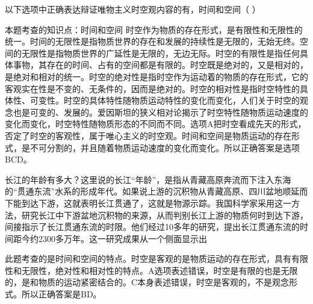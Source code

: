 \question 以下选项中正确表达辩证唯物主义时空观内容的有，时间和空间（ ）
\par{}
\begin{solution}本题考查的知识点：时间和空间
时空作为物质的存在形式，是有限性和无限性的统一。时间的无限性是指物质世界的存在和发展的持续性是无限的，无始无终。空间的无限性是指物质世界的广延性是无限的，无边无际。时空的有限性是指任何具体事物，其存在的时间、占有的空间都是有限的。时空既是绝对的，又是相对的，是绝对和相对的统一。时空的绝对性是指时空作为运动着的物质的存在形式，它的客观实在性是不变的、无条件的，因而是绝对的。时空的相对性是指时空特性的具体性、可变性。时空的具体特性随物质运动特性的变化而变化，人们关于时空的观念也是可变的、发展的。爱因斯坦的狭义相对论揭示了时空特性随物质运动速度的变化而变化，时空特性随物质形态的不同而不同。选项A把时空看成先天的形式，否定了时空的客观性，属于唯心主义的时空观。时间和空间是物质运动的存在形式，是不可分割的，并且随着物质运动速度的变化而变化。所以正确答案是选项BCD。
\end{solution}
\question 长江的年龄有多大？这里说的长江``年龄''，是指从青藏高原奔流而下注入东海的``贯通东流''水系的形成年代。如果说上游的沉积物从青藏高原、四川盆地顺延而下能到达下游，这就表明长江贯通了，这就是物源示踪。我国科学家采用这一方法，研究长江中下游盆地沉积物的来源，从而判别长江上游的物质何时到达下游，间接指示了长江贯通东流的时限。他们经过10多年的研究，提出长江贯通东流的时间距今约2300多万年。这一研究成果从一个侧面显示出
\par{}
\begin{solution}此题考查的是时间和空间的特点。时空是客观的是物质运动的存在形式，具有有限性和无限性，绝对性和相对性的特点。A选项表述错误，时空是有限的也是无限的，是和物质的运动紧密结合的。C本身表述错误，时空是客观的，不是观念形式。所以正确答案是BD。
\end{solution}
